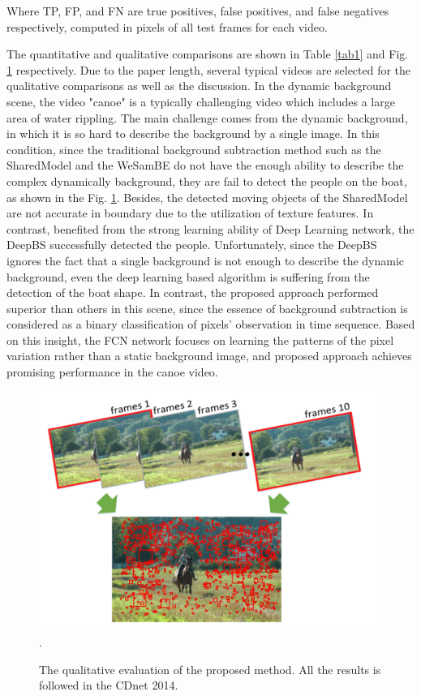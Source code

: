 \documentclass[journal]{IEEEtran}
\newcommand{\reffig}[1]{Fig. \ref{#1}}
\newcommand{\reftab}[1]{Table \ref{#1}}
\begin{document}
Where TP, FP, and FN are true positives, false positives, and false negatives respectively, computed in pixels of all test frames for each video. 


The quantitative and qualitative comparisons are shown in \reftab{tab1} and  \reffig{results_chart} respectively. 
Due to the paper length, several typical videos are selected for the qualitative comparisons as well as the discussion. 
In the dynamic background scene, the video "canoe" is a typically challenging video which includes a large area of water rippling. 
The main challenge comes from the dynamic background, in which it is so hard to describe the background by a single image. 
In this condition, since the traditional background subtraction method such as the SharedModel and the WeSamBE do not have the enough ability to describe the complex dynamically background, they are fail to detect the people on the boat, as shown in the \reffig{results_chart}. 
Besides, the detected moving objects of the SharedModel are not accurate in boundary due to the utilization of texture features. 
In contrast, benefited from the strong learning ability of Deep Learning network, the DeepBS successfully detected the people. 
Unfortunately, since the DeepBS ignores the fact that a single background is not enough to describe the dynamic background, even the deep learning based algorithm is suffering from the detection of the boat shape. 
In contrast, the proposed approach performed superior than others in this scene, since the essence of background subtraction is considered as a binary classification of pixels' observation in time sequence. 
Based on this insight, the FCN network focuses on learning the patterns of the pixel variation rather than a static background image, and proposed approach achieves promising performance in the canoe video.

\begin{figure}[!t]	\centering
    \includegraphics[width=\textwidth]{figure/fig3}
\DeclareGraphicsExtensions.
    \caption{The qualitative evaluation of the proposed method. All the results is followed in the CDnet 2014.}
    \label{results_chart}
\end{figure}
\end{document}
